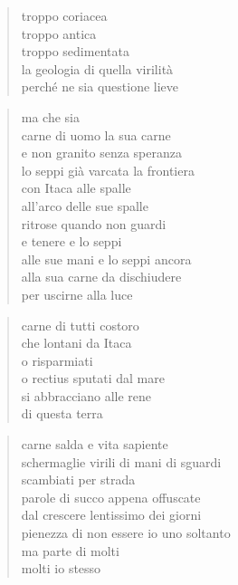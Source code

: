 	\begin{verse}
		troppo coriacea\\
		troppo antica\\
		troppo sedimentata\\
		la geologia di quella virilità\\
		perché ne sia questione lieve
	\end{verse}

	\begin{verse}
		ma che sia\\
		carne di uomo la sua carne\\
		e non granito senza speranza\\
		lo seppi già varcata la frontiera\\
		con Itaca alle spalle\\
		all’arco delle sue spalle\\
		ritrose quando non guardi\\
		e tenere e lo seppi\\
		alle sue mani e lo seppi ancora\\
		alla sua carne da dischiudere\\
		per uscirne alla luce
	\end{verse}

\clearpage



	\begin{verse}
		carne di tutti costoro\\
		che lontani da Itaca\\
		o risparmiati\\
		o rectius sputati dal mare\\
		si abbracciano alle rene\\
		di questa terra
	\end{verse}

	\begin{verse}
		carne salda e vita sapiente\\
		schermaglie virili di mani di sguardi\\
		scambiati per strada\\
		parole di succo appena offuscate\\
		dal crescere lentissimo dei giorni\\
		pienezza di non essere io uno soltanto\\
		ma parte di molti\\
		molti io stesso
	\end{verse}

